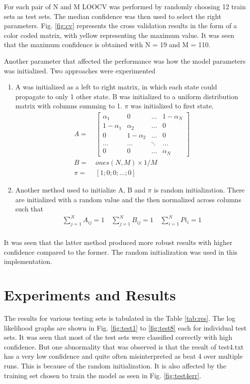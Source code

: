 \documentclass[fleqn,10pt]{SelfArx} %
\begin{document}
 For each pair of N and M LOOCV was performed by randomly choosing 12 train sets as test sets. The median confidence was then used to select the right parameters. Fig. \ref{fig:cv} represents the cross validation results in the form of a color coded matrix, with yellow representing the maximum value. It was seen that the maximum confidence is obtained with N = 19 and M = 110.

Another parameter that affected the performance was how the model parameters was initialized. Two approaches were experimented
\begin{enumerate}
\item A was initialized as a left to right matrix, in which each state could propagate to only 1 other state. B was initialized to a uniform distribution matrix with columns summing to 1. $\pi$ was initialized to first state.
\begin{align*}
A =&\; \begin{bmatrix}
\alpha_1 & 0 & \ldots & 1 - \alpha_N \\
1 - \alpha_1 & \alpha_2 & \ldots & 0 \\
0 & 1 - \alpha_2 & \ldots & 0 \\
\hdots & \hdots & \ddots & \ldots \\
0 & 0 & \ldots & \alpha_N
\end{bmatrix} \\
B =&\; ones(N,M) \times 1/M \\
\pi =&\; [1;0;0;\ldots;0]
\end{align*}
\item Another method used to initialize A, B and $\pi$ is random initialization. There are initialized with a random value and the then normalized across columns such that
\begin{align*}
\sum_{j=1}^N A_{ij} = 1 \quad
\sum_{j=1}^N B_{ij} = 1\quad
\sum_{i=1}^N Pi_{i} = 1 \\
\end{align*}
\end{enumerate}
\vspace{-1cm}
It was seen that the latter method produced more robust results with higher confidence compared to the former. The random initialization was used in this implementation.

\section{Experiments and Results}
\label{sec:results}
The results for various testing sets is tabulated in the Table \ref{tab:res}. The log likelihood graphs are shown in Fig. \ref{fig:test1} to \ref{fig:test8} each for individual test sets. It was seen that most of the test sets were classified correctly with high confidence. But one abnormality that was observed is that the result of test4.txt has a very low confidence and quite often misinterpreted as beat 4 over multiple runs. This is because of the random initialization. It is also affected by the training set chosen to train the model as seen in Fig. \ref{fig:test4err}. 
\end{document}
